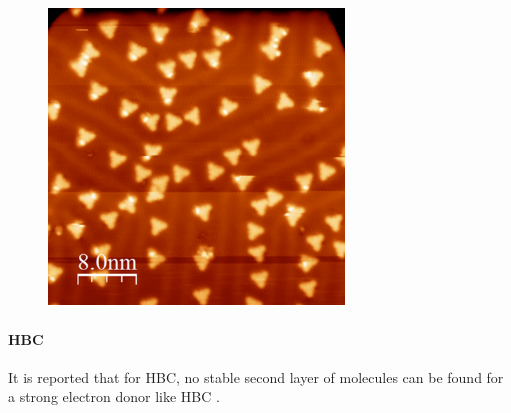 \begin{figure}[] \centering
	\includegraphics[width=0.7\textwidth]{./images/hbbnc-au-111-rt}
	\caption{}
	\label{}
\end{figure}

\paragraph{HBC}It is reported that for HBC, no stable second layer of molecules can be found for a strong electron donor like HBC \cite{de_feyter_two-dimensional_2003}.